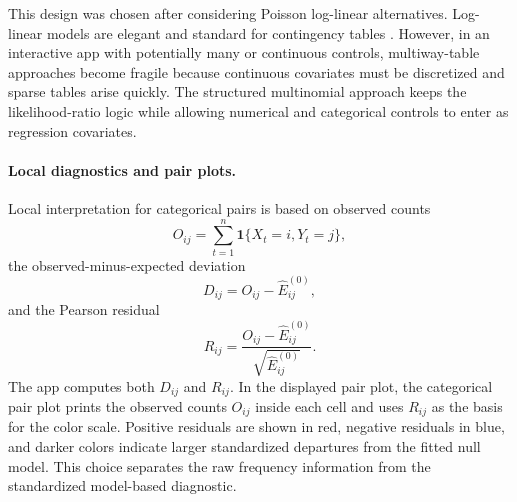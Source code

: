 \documentclass[11pt]{article}
\begin{document}
This design was chosen after considering Poisson log-linear alternatives.
Log-linear models are elegant and standard for contingency tables
\citep{Agresti2013, NelderWedderburn1972}. However, in an interactive app with
potentially many or continuous controls, multiway-table approaches become
fragile because continuous covariates must be discretized and sparse tables
arise quickly. The structured multinomial approach keeps the likelihood-ratio
logic while allowing numerical and categorical controls to enter as regression
covariates.

\paragraph{Local diagnostics and pair plots.}

Local interpretation for categorical pairs is based on observed counts
\begin{equation*}
O_{ij} = \sum_{t=1}^{n}\mathbf{1}\{X_t=i, Y_t=j\},
\end{equation*}
the observed-minus-expected deviation
\begin{equation*}
D_{ij} = O_{ij} - \widehat{E}^{(0)}_{ij},
\end{equation*}
and the Pearson residual
\begin{equation*}
R_{ij} = \frac{O_{ij} - \widehat{E}^{(0)}_{ij}}{\sqrt{\widehat{E}^{(0)}_{ij}}}.
\end{equation*}
The app computes both $D_{ij}$ and $R_{ij}$. In the displayed pair plot,
the categorical pair plot prints the observed counts $O_{ij}$ inside each cell
and uses $R_{ij}$ as the basis for the color scale. Positive residuals are
shown in red, negative residuals in blue, and darker colors indicate larger
standardized departures from the fitted null model. This choice separates the
raw frequency information from the standardized model-based diagnostic.
\end{document}
